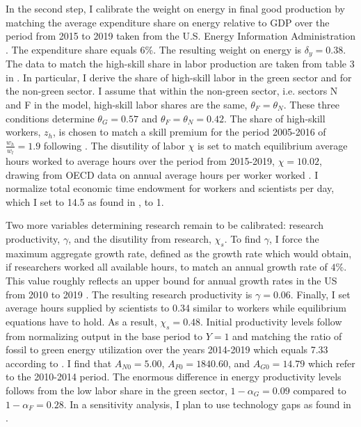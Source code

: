 In the second step, I calibrate the weight on energy in final good production by matching the average expenditure share on energy relative to GDP over the period from 2015 to 2019 taken from the U.S. Energy Information Administration \citep[][Table 1.7]{EIAEnergy}. The expenditure share equals 6\%. The resulting weight on energy is $\delta_y=0.38$. %
 The data to match the high-skill share in labor production are taken from table 3 in \cite{Consoli2016DoCapital}. In particular, I derive the share of high-skill labor in the green sector and for the non-green sector. I assume that within the non-green sector, i.e. sectors N and F in the model, high-skill labor shares are the same, $\theta_F=\theta_N$.  These three conditions determine $\theta_G=0.57$ and $\theta_F=\theta_N=0.42$. The share of high-skill workers, $z_h$, is chosen to match a skill premium for the period 2005-2016 of $\frac{w_h}{w_l}=1.9$ following \cite{Slavik2020WagePremium}. The disutility of labor $\chi$ is set to match equilibrium average hours worked to average hours over the period from 2015-2019, $\chi=10.02$, drawing from OECD data on annual average hours per worker worked \citep{OECDHoursworked}. I normalize total economic time endowment for workers and scientists per day, which I set to 14.5 as found in \cite{Jones1993OptimalGrowth}, to 1. 

 Two more variables determining research remain to be calibrated: research productivity, $\gamma$, and the disutility from research, $\chi_s$.
 To find $\gamma$, I force the maximum aggregate growth rate, defined as the growth rate which would obtain, if researchers worked all available hours, to match an annual growth rate of $4\%$. This value roughly reflects an upper bound for annual growth rates in the US from 2010 to 2019 \citep[compare][]{OECDGDP}.
  The resulting research productivity is $\gamma = 0.06$.  Finally, I set average hours supplied by scientists to 0.34 similar to workers while equilibrium equations have to hold. As a result,  $\chi_s=0.48$. Initial productivity levels follow from normalizing output in the base period to $Y=1$ and matching the ratio of fossil to green energy utilization over the years 2014-2019 which equals 7.33 according to \cite[][Table 1.3]{EIAEnergy}. I find that $A_{N0}=5.00$, $A_{F0}=1840.60$, and $A_{G0}=14.79$ which refer to the 2010-2014 period. The enormous difference in energy productivity levels follows from the low labor share in the green sector, $1-\alpha_G=0.09$ compared to $1-\alpha_F= 0.28$. In a sensitivity analysis, I plan to use technology gaps as found in \cite{Fried2018ClimateAnalysis}. 

